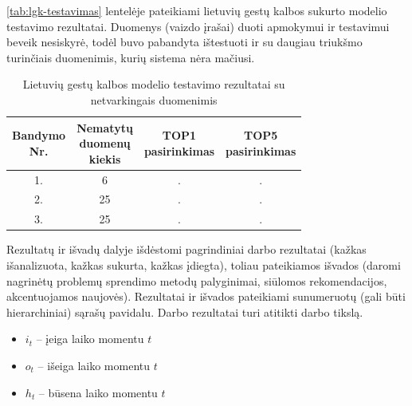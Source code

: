 \documentclass{VUMIFPSbakalaurinis}
\begin{document}
\ref{tab:lgk-testavimas} lentelėje pateikiami lietuvių gestų kalbos sukurto modelio testavimo rezultatai. Duomenys (vaizdo įrašai) duoti apmokymui ir testavimui beveik nesiskyrė, todėl buvo pabandyta ištestuoti ir su daugiau triukšmo turinčiais duomenimis, kurių sistema nėra mačiusi.

\begin{table}[H]\footnotesize
	\centering
	\caption{Lietuvių gestų kalbos modelio testavimo rezultatai su netvarkingais duomenimis}
	{\begin{tabular}{| c | c | c | c |}
		\hline
		\thead{Bandymo\\Nr.} & \thead{Nematytų\\duomenų\\kiekis} & \thead{TOP1\\pasirinkimas}  & \thead{TOP5\\pasirinkimas}  \\
		\hline
		1. & 6 & . & . \\
		\hline
		2. & 25 & . & . \\
		\hline
		3. & 25 & . & . \\
		\hline
	\end{tabular}}
	\label{tab:lgk-testavimas2}
\end{table}

Rezultatų ir išvadų dalyje išdėstomi pagrindiniai darbo rezultatai (kažkas
išanalizuota, kažkas sukurta, kažkas įdiegta), toliau pateikiamos išvados
(daromi nagrinėtų problemų sprendimo metodų palyginimai, siūlomos
rekomendacijos, akcentuojamos naujovės). Rezultatai ir išvados pateikiami
sunumeruotų (gali būti hierarchiniai) sąrašų pavidalu. Darbo rezultatai turi
atitikti darbo tikslą.

\printbibliography[heading=bibintoc]  %


\begin{itemize}
	\item $i_t$ – įeiga laiko momentu $t$
	\item $o_t$ – išeiga laiko momentu $t$
	\item $h_t$ – būsena laiko momentu $t$
\end{itemize}
\end{document}
